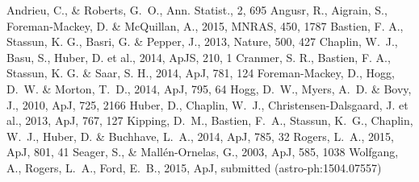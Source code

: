 \documentclass[apjl]{emulateapj}
\begin{document}
\begin{thebibliography}{99}
Andrieu, C., \& Roberts, G.~O., Ann. Statist., 2, 695
Angusr, R., Aigrain, S., Foreman-Mackey, D. \& McQuillan, A., 2015, MNRAS,
450, 1787
 Bastien,
F. A., Stassun, K. G., Basri, G. \& Pepper, J., 2013, Nature, 500, 427
Chaplin, W.~J., Basu, S., Huber, D. et al., 2014, ApJS, 210, 1
Cranmer, S. R., Bastien, F. A., Stassun, K. G. \& Saar, S. H., 2014, ApJ, 781,
124
 Foreman-Mackey, D., Hogg, D.~W. \& Morton, T.~D., 2014,
ApJ, 795, 64
Hogg, D.~W., Myers, A.~D. \& Bovy, J., 2010, ApJ, 725,
2166
Huber, D., Chaplin, W.~J., Christensen-Dalsgaard, J. et al., 2013, ApJ, 767,
127
Kipping, D.~M., Bastien, F.~A., Stassun, K.~G., Chaplin, W.~J., Huber, D. \&
Buchhave, L.~A., 2014, ApJ, 785, 32
Rogers, L.~A., 2015, ApJ, 801, 41
Seager, S., \& Mall\'{e}n-Ornelas, G., 2003, ApJ, 585, 1038
Wolfgang, A., Rogers, L.~A., Ford, E.~B., 2015, ApJ, submitted
(astro-ph:1504.07557)
\end{thebibliography}
\end{document}
